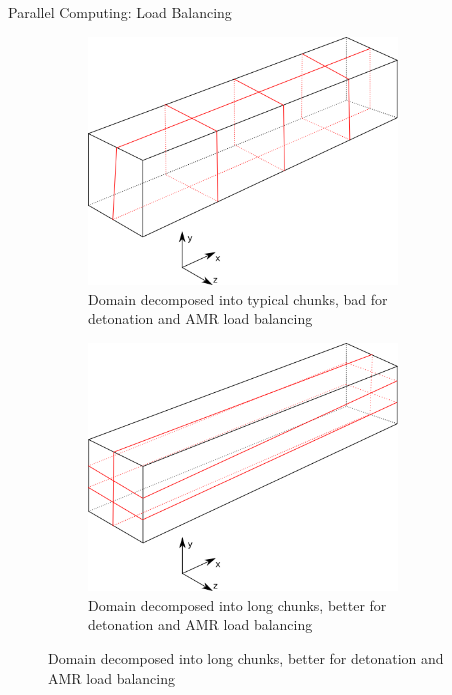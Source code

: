 \begin{frame}{Parallel Computing: Load Balancing}
\begin{figure}[p]
    \centering
    \begin{subfigure}[]{0.45\textwidth}
        \centering
        \includegraphics[width=0.9\textwidth]{../figs/parallel_short.png}
        \caption{Domain decomposed into typical chunks, bad for detonation and AMR load balancing}
    \end{subfigure}%
    \begin{subfigure}[]{0.45\textwidth}
        \centering
        \includegraphics[width=0.9\textwidth]{../figs/parallel_long.png}
        \caption{Domain decomposed into long chunks, better for detonation and AMR load balancing}
    \end{subfigure}
\end{figure}%
\end{frame}

